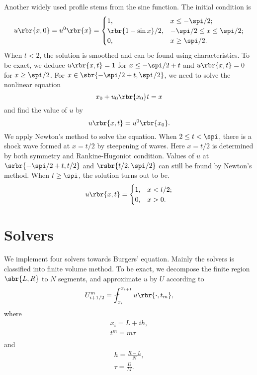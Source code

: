 \documentclass[english, nochinese]{pnote}
\begin{document}
Another widely used profile stems from the sine function. The initial condition is
\begin{equation}
u \rbr{ x, 0 } = u^0 \rbr{x} =
\begin{cases}
1, & x \le -\spi / 2; \\
\rbr{ 1 - \sin x } / 2, & -\spi / 2 \le x \le \spi / 2; \\
0, & x \ge \spi / 2.
\end{cases}
\end{equation}
When $ t < 2 $, the solution is smoothed and can be found using characteristics. To be exact, we deduce $ u \rbr{ x, t } = 1 $ for $ x \le -\spi / 2 + t $ and $ u \rbr{ x, t } = 0 $ for $ x \ge \spi / 2 $. For $ x \in \sbr{ -\spi / 2 + t, \spi / 2 } $, we need to solve the nonlinear equation
\begin{equation}
x_0 + u_0 \rbr{x_0} t = x
\end{equation}
and find the value of $u$ by
\begin{equation}
u \rbr{ x, t } = u^0 \rbr{x_0}.
\end{equation}
We apply Newton's method to solve the equation. When $ 2 \le t < \spi $, there is a shock wave formed at $ x = t / 2 $ by steepening of waves. Here $ x = t / 2 $ is determined by both symmetry and Rankine-Hugoniot condition. Values of $u$ at $ \srbr{ -\spi / 2 + t, t / 2 } $ and $ \rsbr{ t / 2, \spi / 2 } $ can still be found by Newton's method. When $ t \ge \spi $, the solution turns out to be.
\begin{equation}
u \rbr{ x, t } =
\begin{cases}
1, & x < t / 2; \\
0, & x > 0.
\end{cases}
\end{equation}

\section{Solvers}

We implement four solvers towards Burgers' equation. Mainly the solvers is classified into finite volume method. To be exact, we decompose the finite region $ \sbr{ L, R } $ to $N$ segments, and approximate $u$ by $U$ according to
\begin{equation}
U_{ i + 1 / 2 }^m = \fint_{x_i}^{x_{ i + 1 }} u \rbr{ \cdot, t_m },
\end{equation}
where
\begin{gather}
x_i = L + i h, \\
t^m = m \tau \\
\end{gather}
and
\begin{gather}
h = \frac{ R - L }{N}, \\
\tau = \frac{D}{M}.
\end{gather}
\end{document}
